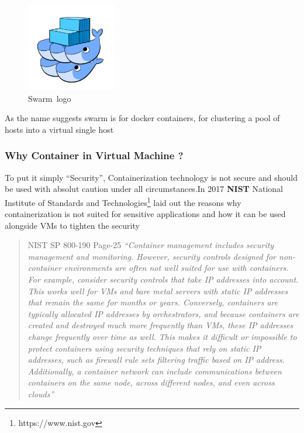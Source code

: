 \documentclass[
  14pt,
  english,
  a4paper,
]{scrreprt}
\begin{document}
\begin{figure}
\hypertarget{fig:swarmlogo}{%
\centering
\includegraphics[width=0.35\textwidth,height=\textheight]{figures/docker-swarm.png}
\caption{Swarm~logo}\label{fig:swarmlogo}
}
\end{figure}

As the name suggests swarm is for docker containers, for clustering a
pool of hosts into a virtual single host

\hypertarget{why-container-in-virtual-machine}{%
\subsubsection{Why Container in Virtual Machine
?}\label{why-container-in-virtual-machine}}

To put it simply ``Security'', Containerization technology is not secure
and should be used with absolut caution under all circumstances.In 2017
\textbf{NIST} National Institute of Standards and
Technologies\footnote{https://www.nist.gov} laid out the reasons why
containerization is not suited for sensitive applications and how it can
be used alongside VMs to tighten the security

\begin{quote}
NIST SP 800-190 Page-25 \emph{``Container management includes security
management and monitoring. However, security controls designed for
non-container environments are often not well suited for use with
containers. For example, consider security controls that take IP
addresses into account. This works well for VMs and bare metal servers
with static IP addresses that remain the same for months or years.
Conversely, containers are typically allocated IP addresses by
orchestrators, and because containers are created and destroyed much
more frequently than VMs, these IP addresses change frequently over time
as well. This makes it difficult or impossible to protect containers
using security techniques that rely on static IP addresses, such as
firewall rule sets filtering traffic based on IP address. Additionally,
a container network can include communications between containers on the
same node, across different nodes, and even across clouds''}
\end{quote}
\end{document}
